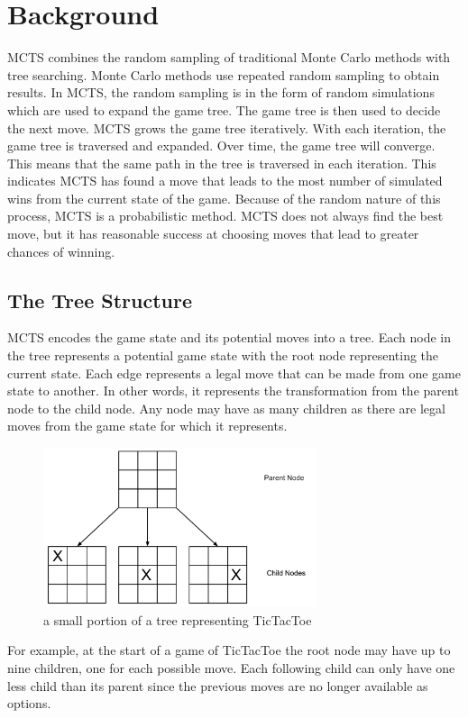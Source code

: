 \documentclass{sig-alternate}
\begin{document}
\section{Background}
MCTS combines the random sampling of traditional Monte Carlo methods with tree searching. Monte Carlo methods use repeated random sampling to obtain results. In MCTS, the random sampling is in the form of random simulations which are used to expand the game tree. The game tree is then used to decide the next move. MCTS grows the game tree iteratively. With each iteration, the game tree is traversed and expanded. Over time, the game tree will converge. This means that the same path in the tree is traversed in each iteration. This indicates MCTS has found a move that leads to the most number of simulated wins from the current state of the game. Because of the random nature of this process, MCTS is a probabilistic method. MCTS does not always find the best move, but it has reasonable success at choosing moves that lead to greater chances of winning.

\subsection{The Tree Structure}\label{sec:TreeStructure}
MCTS encodes the game state and its potential moves into a tree. Each node in the tree represents a potential game state with the root node representing the current state. Each edge represents a legal move that can be made from one game state to another. In other words, it represents the transformation from the parent node to the child node. Any node may have as many children as there are legal moves from the game state for which it represents. 

\begin{figure}[h]
\includegraphics[width=8cm]{TicTacToeTree.pdf}
\centering
\caption{a small portion of a tree representing TicTacToe}
\label{fig:TicTacToe}
\end{figure}

For example, at the start of a game of TicTacToe the root node may have up to nine children, one for each possible move. Each following child can only have one less child than its parent since the previous moves are no longer available as options.
\end{document}

